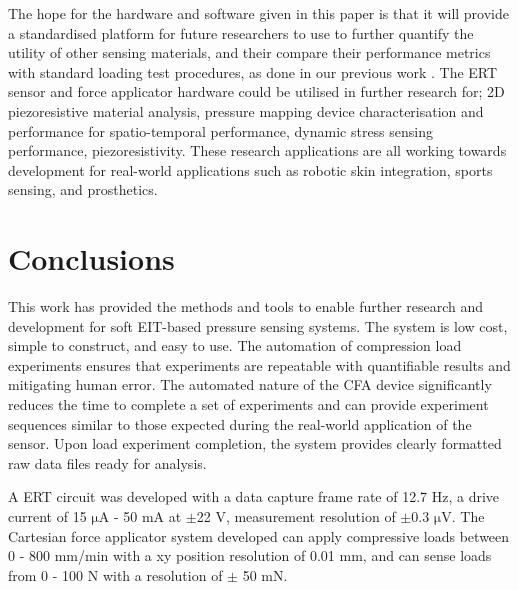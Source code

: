 The hope for the hardware and software given in this paper is that it will provide a standardised platform for future researchers to use to further quantify the utility of other sensing materials, and their compare their performance metrics with standard loading test procedures, as done in our previous work \cite{Ellingham2024}. The ERT sensor and force applicator hardware could be utilised in further research for; 2D piezoresistive material analysis, pressure mapping device characterisation and performance for spatio-temporal performance, dynamic stress sensing performance, piezoresistivity. These research applications are all working towards development for real-world applications such as robotic skin integration, sports sensing, and prosthetics.





\section{Conclusions}
This work has provided the methods and tools to enable further research and development for soft EIT-based pressure sensing systems. The system is low cost, simple to construct, and easy to use. The automation of compression load experiments ensures that experiments are repeatable with quantifiable results and mitigating human error. The automated nature of the CFA device significantly reduces the time to complete a set of experiments and can provide experiment sequences similar to those expected during the real-world application of the sensor. Upon load experiment completion, the system provides clearly formatted raw data files ready for analysis.

A ERT circuit was developed with a data capture frame rate of 12.7 Hz, a drive current of 15 $\mathrm{\mu A}$ - 50 mA at $\pm$22 V, measurement resolution of $\pm$0.3 $\mathrm{\mu V}$. The Cartesian force applicator system developed can apply compressive loads between 0 - 800 mm/min with a xy position resolution of 0.01 mm, and can sense loads from 0 - 100 N with a resolution of $\pm$ 50 mN.

